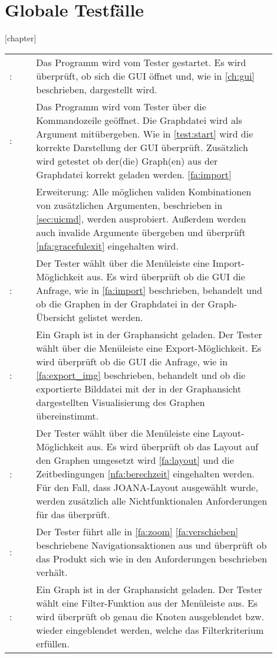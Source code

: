 \chapter{Globale Testfälle}

[chapter]
\setcounter{tnr}{10}
\newcommand{\testno}{\ifnum\value{tnr}<10 00\else\ifnum\value{tnr}<100 0\fi\fi\arabic{tnr}\addtocounter{tnr}{10}}
\newcommand\test[2]{\namedlabel{test:#1}{\textbf{/T\testno/}}: & #2 \\ [1ex] }
\newcommand\etest[3]{\namedlabel{test:#1}{\textbf{/T\testno/}}: & #2 \\ & Erweiterung: #3 \\ [1ex] }

\begin{tabular}{lp{0.9\linewidth}}
  \test{start}{Das Programm wird vom Tester gestartet.
    Es wird überprüft, ob sich die GUI öffnet und, wie in \ref{ch:gui} beschrieben, dargestellt wird.}
  \etest{startcmd}{Das Programm wird vom Tester über die Kommandozeile geöffnet.
    Die Graphdatei wird als Argument mitübergeben.
    Wie in \ref{test:start} wird die korrekte Darstellung der GUI überprüft.
    Zusätzlich wird getestet ob der(die) Graph(en) aus der Graphdatei korrekt geladen werden. \ref{fa:import}}
    {Alle möglichen validen Kombinationen von zusätzlichen Argumenten, beschrieben in \ref{sec:uicmd}, werden ausprobiert.
    Außerdem werden auch invalide Argumente übergeben und überprüft \ref{nfa:gracefulexit} eingehalten wird.}
  \test{import}{Der Tester wählt über die Menüleiste eine Import-Möglichkeit aus.
    Es wird überprüft ob die GUI die Anfrage, wie in \ref{fa:import} beschrieben,
    behandelt und ob die Graphen in der Graphdatei in der Graph-Übersicht gelistet werden.}
  \test{export}{Ein Graph ist in der Graphansicht geladen.
    Der Tester wählt über die Menüleiste eine Export-Möglichkeit.
    Es wird überprüft ob die GUI die Anfrage, wie in \ref{fa:export_img} beschrieben,
    behandelt und ob die exportierte Bilddatei mit der in der Graphansicht dargestellten Visualisierung des Graphen übereinstimmt.}
  \test{layouten}{Der Tester wählt über die Menüleiste eine Layout-Möglichkeit aus.
    Es wird überprüft ob das Layout auf den Graphen umgesetzt wird \ref{fa:layout}
    und die Zeitbedingungen \ref{nfa:berechzeit} eingehalten werden.
    Für den Fall, dass JOANA-Layout ausgewählt wurde,
    werden zusätzlich alle Nichtfunktionalen Anforderungen für das \nameref{sec:nfajoana} überprüft.}
  \test{navigation}{Der Tester führt alle in \ref{fa:zoom} \ref{fa:verschieben} beschriebene Navigationsaktionen aus
    und überprüft ob das Produkt sich wie in den Anforderungen beschrieben verhält.}
  \test{filter}{Ein Graph ist in der Graphansicht geladen.
    Der Tester wählt eine Filter-Funktion aus der Menüleiste aus.
    Es wird überprüft ob genau die Knoten ausgeblendet bzw. wieder eingeblendet werden, welche das Filterkriterium erfüllen.}
\end{tabular}
